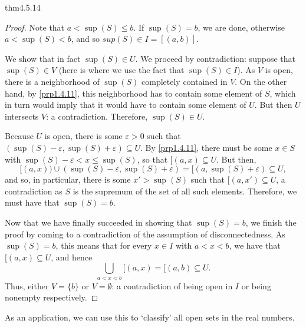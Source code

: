\begin{thm}{}{thm4.5.14}
\begin{proof}
Note that $a<\sup (S)\leq b$.  If $\sup (S)=b$, we are done, otherwise $a<\sup (S)<b$, and so $sup (S)\in I=[(a,b)]$.

We show that in fact $\sup (S)\in U$.  We proceed by contradiction:  suppose that $\sup (S)\in V$ (here is where we use the fact that $\sup (S)\in I$).  As $V$ is open, there is a neighborhood of $\sup (S)$ completely contained in $V$.  On the other hand, by \cref{prp1.4.11}, this neighborhood has to contain some element of $S$, which in turn would imply that it would have to contain some element of $U$.  But then $U$ intersects $V$:  a contradiction.  Therefore, $\sup (S)\in U$.

Because $U$ is open, there is some $\varepsilon >0$ such that $(\sup (S)-\varepsilon ,\sup (S)+\varepsilon )\subseteq U$.  By \cref{prp1.4.11}, there must be some $x\in S$ with $\sup (S)-\varepsilon <x\leq \sup (S)$, so that $[(a,x)\subseteq U$.  But then,
\begin{equation}
[(a,x))\cup (\sup (S)-\varepsilon ,\sup (S)+\varepsilon )=[(a,\sup (S)+\varepsilon )\subseteq U,
\end{equation}
and so, in particular, there is some $x'>\sup (S)$ such that $[(a,x')\subseteq U$,  a contradiction as $S$ is the supremum of the set of all such elements.  Therefore, we must have that $\sup (S)=b$.

Now that we have finally succeeded in showing that $\sup (S)=b$, we finish the proof by coming to a contradiction of the assumption of disconnectedness.  As $\sup (S)=b$, this means that for every $x\in I$ with $a<x<b$, we have that $[(a,x)\subseteq U$, and hence
\begin{equation}
\bigcup _{a<x<b}[(a,x)=[(a,b)\subseteq U.
\end{equation}
Thus, either $V=\{ b\}$ or $V=\emptyset$:  a contradiction of being open in $I$ or being nonempty respectively.
\end{proof}
\end{thm}
As an application, we can use this to `classify' all open sets in the real numbers.
